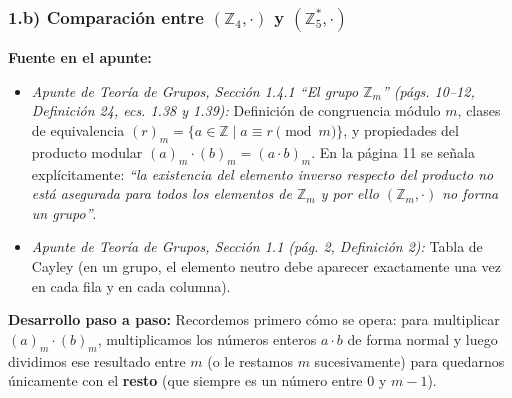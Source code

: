 \documentclass[11pt, a4paper]{article}
\begin{document}
\subsubsection*{1.b) Comparación entre $(\mathbb{Z}_4, \cdot)$ y $(\mathbb{Z}_5^*, \cdot)$}
\textbf{Fuente en el apunte:}
\begin{itemize}
    \item \textit{Apunte de Teoría de Grupos, Sección 1.4.1 ``El grupo $\mathbb{Z}_m$'' (págs. 10--12, Definición 24, ecs. 1.38 y 1.39):} Definición de congruencia módulo $m$, clases de equivalencia $(r)_m = \{a \in \mathbb{Z} \mid a \equiv r \pmod m\}$, y propiedades del producto modular $(a)_m \cdot (b)_m = (a \cdot b)_m$. En la página 11 se señala explícitamente: \textit{``la existencia del elemento inverso respecto del producto no está asegurada para todos los elementos de $\mathbb{Z}_m$ y por ello $(\mathbb{Z}_m, \cdot)$ no forma un grupo''}.
    \item \textit{Apunte de Teoría de Grupos, Sección 1.1 (pág. 2, Definición 2):} Tabla de Cayley (en un grupo, el elemento neutro debe aparecer exactamente una vez en cada fila y en cada columna).
\end{itemize}

\textbf{Desarrollo paso a paso:}
Recordemos primero cómo se opera: para multiplicar $(a)_m \cdot (b)_m$, multiplicamos los números enteros $a \cdot b$ de forma normal y luego dividimos ese resultado entre $m$ (o le restamos $m$ sucesivamente) para quedarnos únicamente con el \textbf{resto} (que siempre es un número entre $0$ y $m-1$).
\end{document}

